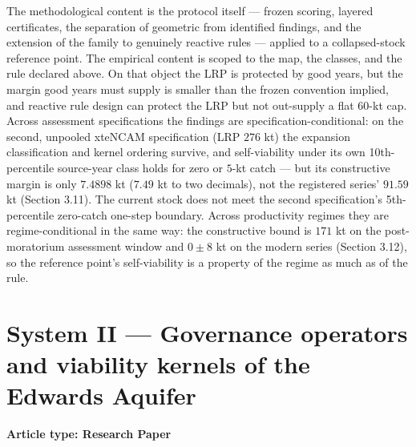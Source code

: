 The methodological content is the protocol itself --- frozen scoring,
layered certificates, the separation of geometric from identified
findings, and the extension of the family to genuinely reactive rules
--- applied to a collapsed-stock reference point. The empirical content
is scoped to the map, the classes, and the rule declared above. On that
object the LRP is protected by good years, but the margin good years
must supply is smaller than the frozen convention implied, and reactive
rule design can protect the LRP but not out-supply a flat 60-kt cap.
Across assessment specifications the findings are
specification-conditional: on the second, unpooled xteNCAM specification
(LRP \(276\) kt) the expansion classification and kernel ordering
survive, and self-viability under its own 10th-percentile source-year
class holds for zero or \(5\)-kt catch --- but its constructive margin
is only \(7.4898\) kt (\(7.49\) kt to two decimals), not the registered series' \(91.59\) kt
(Section 3.11). The current stock does not meet the second
specification's 5th-percentile zero-catch one-step boundary. Across productivity regimes they are
regime-conditional in the same way: the constructive bound is
\(171\) kt on the post-moratorium assessment window and \(0 \pm 8\)
kt on the modern series (Section 3.12), so the reference point's
self-viability is a property of the regime as much as of the rule.

\part*{System II --- Governance operators and viability kernels of the Edwards Aquifer}
\label{part:edwards}

{\centering\small \textbf{Article type: Research Paper}\par}

